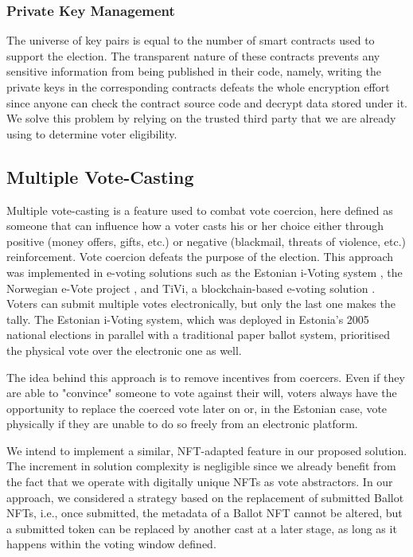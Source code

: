 \documentclass[../main.tex]{subfiles}
\begin{document}
\subsubsection{Private Key Management}
The universe of key pairs is equal to the number of smart contracts used to support the election. The transparent nature of these contracts prevents any sensitive information from being published in their code, namely, writing the private keys in the corresponding contracts defeats the whole encryption effort since anyone can check the contract source code and decrypt data stored under it. We solve this problem by relying on the trusted third party that we are already using to determine voter eligibility.

\subsection{Multiple Vote-Casting}
\label{sec:multiple_vote_casting}
Multiple vote-casting is a feature used to combat vote coercion, here defined as someone that can influence how a voter casts his or her choice either through positive (money offers, gifts, etc.) or negative (blackmail, threats of violence, etc.) reinforcement. Vote coercion defeats the purpose of the election. This approach was implemented in e-voting solutions such as the Estonian i-Voting system \cite{Madise2006}, the Norwegian e-Vote project \cite{Barrat2012}, and TiVi, a blockchain-based e-voting solution \cite{TiVi2021}. Voters can submit multiple votes electronically, but only the last one makes the tally. The Estonian i-Voting system, which was deployed in Estonia's 2005 national elections in parallel with a traditional paper ballot system, prioritised the physical vote over the electronic one as well.
\par
The idea behind this approach is to remove incentives from coercers. Even if they are able to "convince" someone to vote against their will, voters always have the opportunity to replace the coerced vote later on or, in the Estonian case, vote physically if they are unable to do so freely from an electronic platform.
\par
We intend to implement a similar, NFT-adapted feature in our proposed solution. The increment in solution complexity is negligible since we already benefit from the fact that we operate with digitally unique NFTs as vote abstractors. In our approach, we considered a strategy based on the replacement of submitted Ballot NFTs, i.e., once submitted, the metadata of a Ballot NFT cannot be altered, but a submitted token can be replaced by another cast at a later stage, as long as it happens within the voting window defined.
\end{document}
